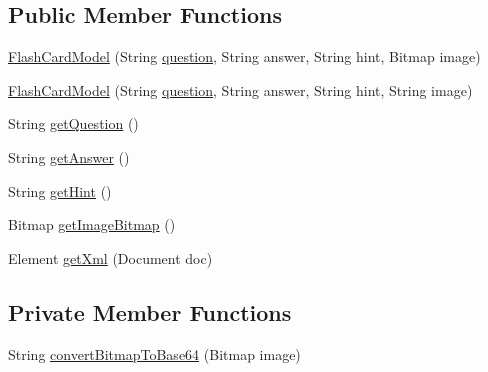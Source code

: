\subsection*{Public Member Functions}
\begin{DoxyCompactItemize}
\item 
\hyperlink{classorg_1_1buildmlearn_1_1toolkit_1_1templates_1_1FlashCardModel_a2dd9b2a68f1b2b6ada40d09b5a641f64}{Flash\+Card\+Model} (String \hyperlink{quiz__content_8txt_a4a899bd252c466e4cb51d25efbeae317}{question}, String answer, String hint, Bitmap image)
\item 
\hyperlink{classorg_1_1buildmlearn_1_1toolkit_1_1templates_1_1FlashCardModel_ab57e165bc61b3bc72c50a7fbadabedbe}{Flash\+Card\+Model} (String \hyperlink{quiz__content_8txt_a4a899bd252c466e4cb51d25efbeae317}{question}, String answer, String hint, String image)
\item 
String \hyperlink{classorg_1_1buildmlearn_1_1toolkit_1_1templates_1_1FlashCardModel_abf8ce19f627a4783f734dd05366c83be}{get\+Question} ()
\item 
String \hyperlink{classorg_1_1buildmlearn_1_1toolkit_1_1templates_1_1FlashCardModel_af7ada5f29f1967ffe976b8c1ac513c5e}{get\+Answer} ()
\item 
String \hyperlink{classorg_1_1buildmlearn_1_1toolkit_1_1templates_1_1FlashCardModel_a89685e7a56be83bd6718ba0b3eb88eb0}{get\+Hint} ()
\item 
Bitmap \hyperlink{classorg_1_1buildmlearn_1_1toolkit_1_1templates_1_1FlashCardModel_acc164af071d93c3ab9348310f3dbf8aa}{get\+Image\+Bitmap} ()
\item 
Element \hyperlink{classorg_1_1buildmlearn_1_1toolkit_1_1templates_1_1FlashCardModel_a08112a6fbb90f87602d2b96da37e8cd8}{get\+Xml} (Document doc)
\end{DoxyCompactItemize}
\subsection*{Private Member Functions}
\begin{DoxyCompactItemize}
\item 
String \hyperlink{classorg_1_1buildmlearn_1_1toolkit_1_1templates_1_1FlashCardModel_a5e19c71e8232293f5543a9f5a018b519}{convert\+Bitmap\+To\+Base64} (Bitmap image)
\end{DoxyCompactItemize}
